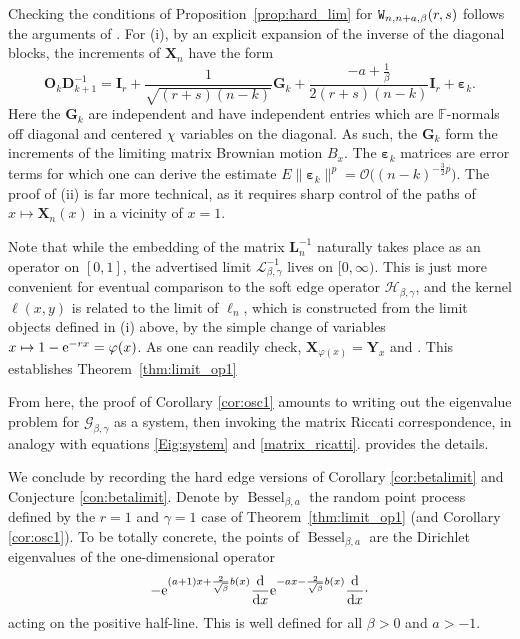 \documentclass[pdftex]{sigma}
\numberwithin{equation}{section}
\theoremstyle{definition}
\newcommand{\eps}{\varepsilon}
\newcommand{\FF}{{\mathbb{F}}}
\newcommand{\mbf}[1]{\mathbf{#1}}
\begin{document}
Checking the conditions of Proposition~\ref{prop:hard_lim} for ${\tt{W}}_{n, n+a,\beta}(r,s)$ follows the arguments of \cite{RR2}.
For (i), by an explicit expansion of the inverse of the diagonal blocks, the increments of
$\mbf{X}_n$ have the form
\[
 {\mbf{O}}_k {\mbf{D}}_{k+1}^{-1} = \mbf{I}_r + \frac{1}{\sqrt{ (r+s)(n-k)}} \mbf{G}_k + \frac{-a+ \frac{1}{\beta} }{2(r+s) (n-k)} \mbf{I}_r + \boldsymbol{\varepsilon}_k.
\]
Here the $\mbf{G}_k$ are independent and have independent entries which are $\FF$-normals off diagonal and centered $\chi$ variables on the diagonal. As such, the $\mbf{G}_k$ form the increments of the limiting matrix Brownian motion $B_x$. The
$\boldsymbol{\varepsilon}_k$ matrices are error terms for which
one can derive the estimate $E \|\boldsymbol{\eps}_k \|^p
= \mathcal{O}\bigl( (n-k)^{-\frac{3}{2} p}\bigr)$.
The proof of (ii) is far more technical, as it requires sharp control of the paths of $x \mapsto \mbf{X}_n(x)$ in a vicinity of $x=1$.


Note that while the embedding of the matrix $\mbf{L}_n^{-1}$ naturally takes place as an operator on $[0,1]$, the advertised limit $\mathcal{L}^{-1}_{\beta, \gamma}$ lives on $[0, \infty)$.
This is just more convenient for eventual comparison to the soft edge operator
$\mathcal{H}_{\beta, \gamma}$, and the kernel $\ell(x,y)$ is related to the limit of $\ell_n$, which is constructed from the limit objects defined in (i) above, by the simple change of variables $x \mapsto 1 - {\rm e}^{-rx} =\varphi(x)$. As one can readily check, $ \mbf{X}_{\varphi(x)} = \mbf{Y}_x$ and
. This establishes Theorem~\ref{thm:limit_op1}

From here, the proof of Corollary \ref{cor:osc1} amounts to writing out the eigenvalue problem for $\mathcal{G}_{\beta, \gamma}$ as a system, then invoking the matrix Riccati correspondence, in analogy with equations \eqref{Eig:system} and \eqref{matrix_ricatti}. \cite[Section 4]{RR2} provides the details.

We conclude by recording the hard edge versions of Corollary \ref{cor:betalimit} and Conjecture \ref{con:betalimit}. Denote by
$\operatorname{Bessel}_{\beta, a}$ the random point process defined by the
$r=1$ and $\gamma =1$ case of Theorem~\ref{thm:limit_op1} (and Corollary \ref{cor:osc1}). To be totally concrete, the points of $\operatorname{Bessel}_{\beta, a}$
are the Dirichlet eigenvalues of the one-dimensional operator
\begin{align*}
 -{\rm e}^{(a+1)x +\frac{2}{\sqrt{\beta}} b(x)} \frac{\rm d}{{\rm d}x} {\rm e}^{-ax -\frac{2}{\sqrt{\beta}} b(x)} \frac{\rm d}{{\rm d}x} \cdot
\end{align*}
 acting on the positive half-line. This is well defined
for all $\beta > 0$ and $a> -1$.
\end{document}
